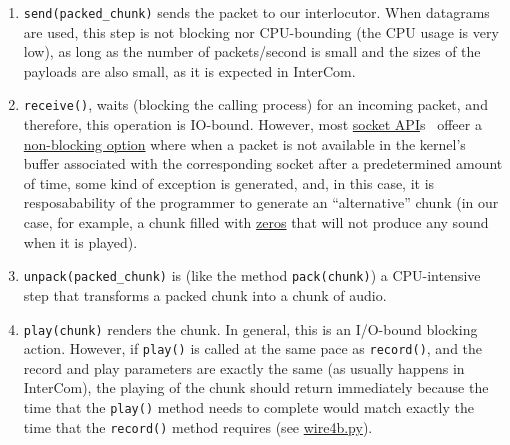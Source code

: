 \begin{enumerate}
\item \verb|send(packed_chunk)| sends the packet to our
  interlocutor. When datagrams are used, this step is not blocking nor
  CPU-bounding (the CPU usage is very low), as long as the number of
  packets/second is small and the sizes of the payloads are also
  small, as it is expected in InterCom.

\item \verb|receive()|, waits (blocking the calling process) for an
  incoming packet, and therefore, this operation is IO-bound. However,
  most \href{https://docs.python.org/3/library/socket.html}{socket
    API}s~\cite{python} offeer a
  \href{https://docs.python.org/3.8/library/socket.html#socket.socket.setblocking}{non-blocking
    option} where when a packet is not available in the kernel's
  buffer associated with the corresponding socket after a
  predetermined amount of time, some kind of exception is generated,
  and, in this case, it is resposabability of the programmer to
  generate an ``alternative'' chunk (in our case, for example, a chunk
  filled with
  \href{https://en.wikipedia.org/wiki/Digital_audio#Overview}{zeros}
  that will not produce any sound when it is played).

\item \verb|unpack(packed_chunk)| is (like the method
  \texttt{pack(chunk)}) a CPU-intensive step that transforms a
  packed chunk into a chunk of audio.

\item \verb|play(chunk)| renders the chunk. In general, this is an
  I/O-bound blocking action. However, if \verb|play()| is called at
  the same pace as \verb|record()|, and the record and play parameters
  are exactly the same (as usually happens in InterCom), the playing of
  the chunk should return immediately because the time that the
  \verb|play()| method needs to complete would match exactly the time
  that the \verb|record()| method requires (see
  \href{https://github.com/Tecnologias-multimedia/InterCom/blob/master/test/sounddevice/wire4b.py}{wire4b.py}).
\end{enumerate}

\begin{comment}
This algorithm works fine if the chunk size is controlled by
(\verb|sounddevice|) and also, the run-time required by the operations
\verb|pack(chunk)| and \verb|unpack(packet)| is shorter than the chunk
time. Unfortunately, the first premise (that we can use varying chunk
sizes) complicates slightly the implementation because we would work
with chunks of different lengths (that as you can see running
\verb|wire4.py|, in most of the iterations the size of the read chunk
is 0). This also complicates the control of the latency because the
chunk size is variable. However, the real problem appears when our
computer is not able to satisfy the second requirement, i.e., when the
chunk time is smaller than the time that we need to process the
chunks. This can only be addressed through code optimization, for
example, parallelization.
\end{comment}

